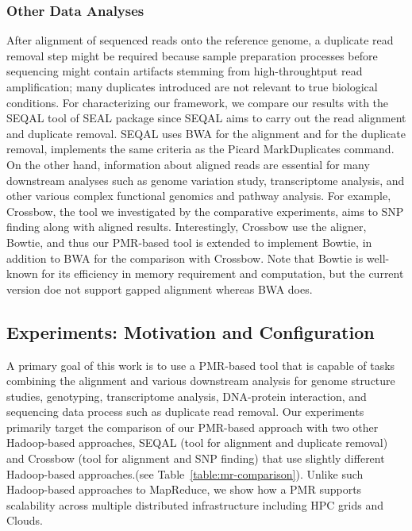 \documentclass{sig-alternate}
\begin{document}
{\subsubsection{Other Data Analyses}

After alignment of sequenced reads onto the reference genome, a duplicate read removal step might be required because sample preparation processes before sequencing might contain artifacts stemming from high-throughtput read amplification; many duplicates introduced are not relevant to true biological conditions.  For characterizing our framework, we compare our results with the SEQAL tool of SEAL package since SEQAL aims to carry out the read alignment and duplicate removal.  SEQAL uses BWA for the alignment and for the duplicate removal, implements the same criteria as the Picard MarkDuplicates command\cite{seal2011,seal_2011_mapred}.  On the other hand, information about aligned reads are essential for many downstream analyses such as genome variation study, transcriptome analysis, and other various complex functional genomics and pathway analysis.  For example, Crossbow, the tool we investigated by the comparative experiments, aims to SNP finding along with aligned results\cite{langmead2009}.  Interestingly, Crossbow use the aligner, Bowtie, and thus our PMR-based tool is extended to implement Bowtie, in addition to BWA for the comparison with Crossbow.  Note that Bowtie is well-known for its efficiency in memory requirement and computation, but the current version doe not support gapped alignment whereas BWA does.

\subsection{Experiments: Motivation and Configuration}



A primary goal of this work is to use a PMR-based tool that is capable
of tasks combining the alignment and various downstream analysis for
genome structure studies, genotyping, transcriptome analysis,
DNA-protein interaction, and sequencing data process such as duplicate
read removal.  Our experiments primarily target the comparison of our
PMR-based approach with two other Hadoop-based approaches, SEQAL (tool
for alignment and duplicate removal) and Crossbow (tool for alignment
and SNP finding) that use slightly different Hadoop-based
approaches.(see Table~\ref{table:mr-comparison}).  Unlike such
Hadoop-based approaches to MapReduce, we show how a PMR supports
scalability across multiple distributed infrastructure including HPC
grids and Clouds.

}
\end{document}
